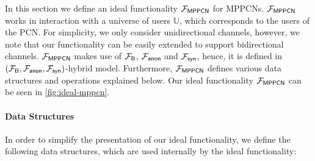 In this section we define an ideal functionality $\mathcal{F}_{\mathsf{MPPCN}}$ for MPPCNs. 
$\mathcal{F}_{\mathsf{MPPCN}}$ works in interaction with a universe of users $\mathbb{U}$, which 
corresponds to the users of the PCN. For simplicity, we only consider unidirectional channels, 
however, we note that our functionality can be easily extended to support bidirectional 
channels. $\mathcal{F}_{\mathsf{MPPCN}}$ makes use of $\mathcal{F}_{\mathsf{B}}$, $\mathcal{F}_{\mathsf{anon}}$ and $\mathcal{F}_{\mathsf{syn}}$, 
hence, it is defined in $(\mathcal{F}_{\mathsf{B}}, \mathcal{F}_{\mathsf{anon}}, \mathcal{F}_{\mathsf{syn}})$-hybrid model. Furthermore, 
$\mathcal{F}_{\mathsf{MPPCN}}$ defines various data structures and operations explained below. 
Our ideal functionality $\mathcal{F}_{\mathsf{MPPCN}}$ can be seen in \cref{fig:ideal-mppcn}.

\paragraph{Data Structures} 
In order to simplify the presentation of our ideal functionality, we define the following 
data structures, which are used internally by the ideal functionality:

